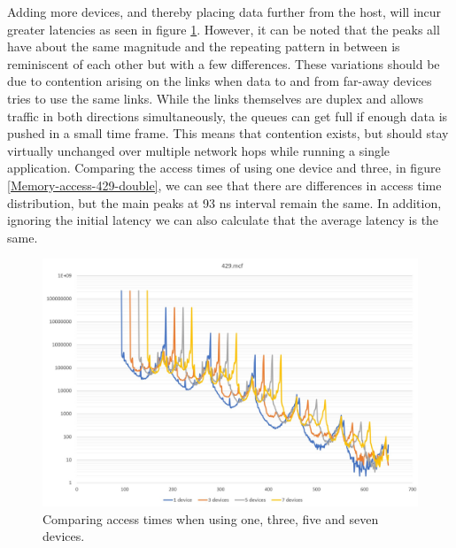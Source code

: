Adding more devices, and thereby placing data further from the host, will incur greater latencies as seen in figure \ref{Memory-access-429}. However, it can be noted that the peaks all have about the same magnitude and the repeating pattern in between is reminiscent of each other but with a few differences. These variations should be due to contention arising on the links when data to and from far-away devices tries to use the same links. While the links themselves are duplex and allows traffic in both directions simultaneously, the queues can get full if enough data is pushed in a small time frame. This means that contention exists, but should stay virtually unchanged over multiple network hops while running a single application. Comparing the access times of using one device and three, in figure \ref{Memory-access-429-double}, we can see that there are differences in access time distribution, but the main peaks at 93 ns interval remain the same. In addition, ignoring the initial latency we can also calculate that the average latency is the same. 
\bigskip

\begin{figure}[!ht]
    \centering
    \includegraphics[width=1.0\linewidth]{figure/429-x_4.jpg}
    \caption{Comparing access times when using one, three, five and seven devices.}
    \label{Memory-access-429}
\end{figure}

